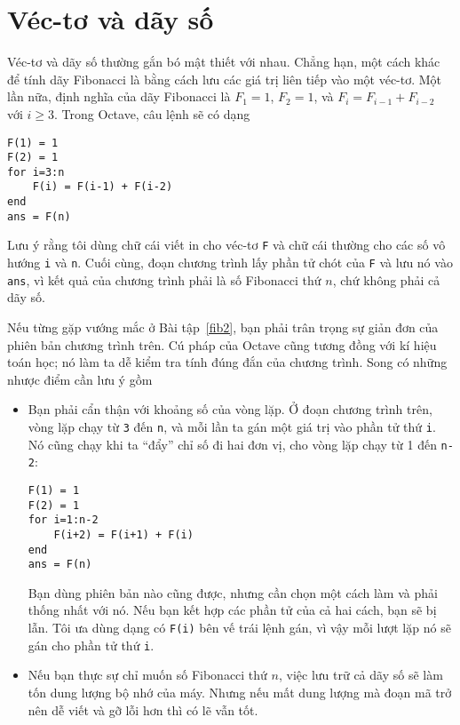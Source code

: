 \documentclass[12pt]{book}
\begin{document}
\section{Véc-tơ và dãy số}

Véc-tơ và dãy số thường gắn bó mật thiết với nhau. Chẳng hạn, một
cách khác để tính dãy Fibonacci là bằng cách lưu các giá trị liên
tiếp vào một véc-tơ. Một lần nữa, định nghĩa của dãy Fibonacci là
$F_1 = 1$, $F_2 = 1$, và $F_{i} = F_{i-1} +
F_{i-2}$ với $i \ge 3$.  Trong Octave, câu lệnh sẽ có dạng

\begin{verbatim}
F(1) = 1
F(2) = 1
for i=3:n
    F(i) = F(i-1) + F(i-2)
end
ans = F(n)
\end{verbatim}
%
Lưu ý rằng tôi dùng chữ cái viết in cho véc-tơ {\tt F}
và chữ cái thường cho các số vô hướng {\tt i} và {\tt n}.
Cuối cùng, đoạn chương trình lấy phần tử chót của {\tt F} và
lưu nó vào {\tt ans}, vì kết quả của chương trình phải là
số Fibonacci thứ $n$, chứ không phải cả dãy số.

Nếu từng gặp vướng mắc ở Bài tập~\ref{fib2}, bạn phải 
trân trọng sự giản đơn của phiên bản chương trình trên. 
Cú pháp của Octave cũng tương đồng với kí hiệu toán học; nó
làm ta dễ kiểm tra tính đúng đắn của chương trình. Song 
có những nhược điểm cần lưu ý gồm

\begin{itemize}

\item Bạn phải cẩn thận với khoảng số của vòng lặp. Ở đoạn
chương trình trên, vòng lặp chạy từ {\tt 3} đến {\tt n},
và mỗi lần ta gán một giá trị vào phần tử thứ {\tt i}.
Nó cũng chạy khi ta ``đẩy'' chỉ số đi hai đơn vị, cho
vòng lặp chạy từ 1 đến {\tt n-2}:

\begin{verbatim}
F(1) = 1
F(2) = 1
for i=1:n-2
    F(i+2) = F(i+1) + F(i)
end
ans = F(n)
\end{verbatim}
%
Bạn dùng phiên bản nào cũng được, nhưng cần chọn một cách
làm và phải thống nhất với nó. Nếu bạn kết hợp các phần tử
của cả hai cách, bạn sẽ bị lẫn. Tôi ưa dùng dạng có {\tt F(i)}
bên vế trái lệnh gán, vì vậy mỗi lượt lặp nó sẽ gán cho phần
tử thứ {\tt i}.

\item Nếu bạn thực sự chỉ muốn số Fibonacci thứ $n$, việc 
lưu trữ cả dãy số sẽ làm tốn dung lượng bộ nhớ của máy. Nhưng
nếu mất dung lượng mà đoạn mã trở nên dễ viết và gỡ lỗi hơn
thì có lẽ vẫn tốt.

\end{itemize}
\end{document}
